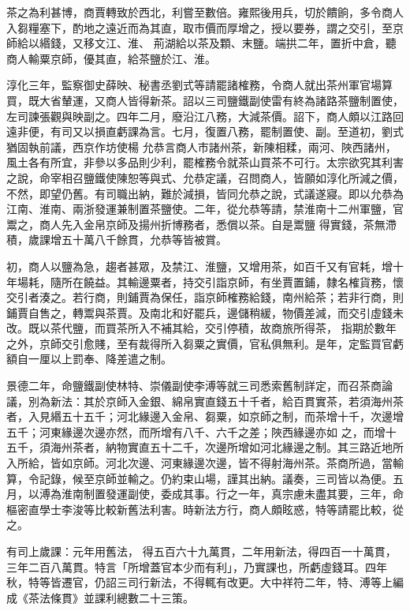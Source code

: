 \begin{pinyinscope}
 茶之為利甚博，商賈轉致於西北，利嘗至數倍。雍熙後用兵，切於饋餉，多令商人入芻糧塞下，酌地之遠近而為其直，取市價而厚增之，授以要券，謂之交引，至京師給以緡錢，又移文江、淮、
 荊湖給以茶及顆、末鹽。端拱二年，置折中倉，聽商人輸粟京師，優其直，給茶鹽於江、淮。



 淳化三年，監察御史薛映、秘書丞劉式等請罷諸榷務，令商人就出茶州軍官場算買，既大省輦運，又商人皆得新茶。詔以三司鹽鐵副使雷有終為諸路茶鹽制置使，左司諫張觀與映副之。四年二月，廢沿江八務，大減茶價。詔下，商人頗以江路回遠非便，有司又以損直虧課為言。七月，復置八務，罷制置使、副。至道初，劉式猶固執前議，西京作坊使楊
 允恭言商人市諸州茶，新陳相糅，兩河、陜西諸州，風土各有所宜，非參以多品則少利，罷榷務令就茶山買茶不可行。太宗欲究其利害之說，命宰相召鹽鐵使陳恕等與式、允恭定議，召問商人，皆願如淳化所減之價，不然，即望仍舊。有司職出納，難於減損，皆同允恭之說，式議遂寢。即以允恭為江南、淮南、兩浙發運兼制置茶鹽使。二年，從允恭等請，禁淮南十二州軍鹽，官鬻之，商人先入金帛京師及揚州折博務者，悉償以茶。自是鬻鹽
 得實錢，茶無滯積，歲課增五十萬八千餘貫，允恭等皆被賞。



 初，商人以鹽為急，趨者甚眾，及禁江、淮鹽，又增用茶，如百千又有官耗，增十年場耗，隨所在饒益。其輸邊粟者，持交引詣京師，有坐賈置鋪，隸名榷貨務，懷交引者湊之。若行商，則鋪賈為保任，詣京師榷務給錢，南州給茶；若非行商，則鋪賈自售之，轉鬻與茶賈。及南北和好罷兵，邊儲稍緩，物價差減，而交引虛錢未改。既以茶代鹽，而買茶所入不補其給，交引停積，故商旅所得茶，
 指期於數年之外，京師交引愈賤，至有裁得所入芻粟之實價，官私俱無利。是年，定監買官虧額自一厘以上罰奉、降差遣之制。



 景德二年，命鹽鐵副使林特、崇儀副使李溥等就三司悉索舊制詳定，而召茶商論議，別為新法：其於京師入金銀、綿帛實直錢五十千者，給百貫實茶，若須海州茶者，入見緡五十五千；河北緣邊入金帛、芻粟，如京師之制，而茶增十千，次邊增五千；河東緣邊次邊亦然，而所增有八千、六千之差；陜西緣邊亦如
 之，而增十五千，須海州茶者，納物實直五十二千，次邊所增如河北緣邊之制。其三路近地所入所給，皆如京師。河北次邊、河東緣邊次邊，皆不得射海州茶。茶商所過，當輸算，令記錄，候至京師並輸之。仍約束山場，謹其出納。議奏，三司皆以為便。五月，以溥為淮南制置發運副使，委成其事。行之一年，真宗慮未盡其要，三年，命樞密直學士李浚等比較新舊法利害。時新法方行，商人頗眩惑，特等請罷比較，從之。



 有司上歲課：元年用舊法，
 得五百六十九萬貫，二年用新法，得四百一十萬貫，三年二百八萬貫。特言「所增蓋官本少而有利」，乃實課也，所虧虛錢耳。四年秋，特等皆遷官，仍詔三司行新法，不得輒有改更。大中祥符二年，特、溥等上編成《茶法條貫》並課利總數二十三策。




\end{pinyinscope}
